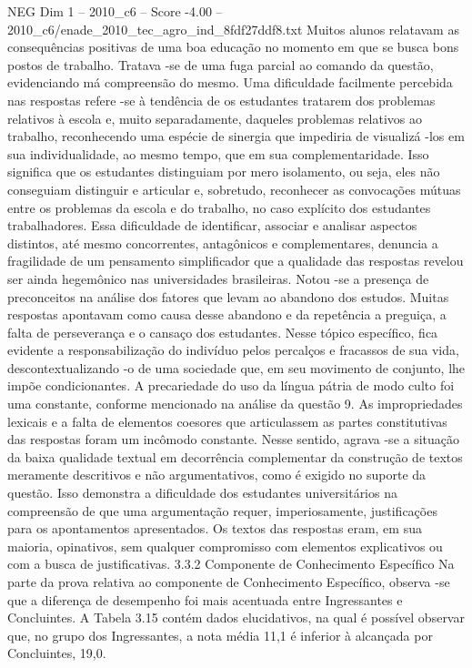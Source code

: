 \begin{textsample}{NEG Dim 1 – 2010\_c6 – Score -4.00 – 2010\_c6/enade\_2010\_tec\_agro\_ind\_8fdf27ddf8.txt}
Muitos alunos relatavam as consequências positivas de uma boa educação no momento em que se busca bons postos de trabalho.
Tratava -se de uma fuga parcial ao comando da questão, evidenciando má compreensão do mesmo.
Uma dificuldade facilmente percebida nas respostas refere -se à tendência de os estudantes tratarem dos problemas relativos à escola e, muito separadamente, daqueles problemas relativos ao trabalho, reconhecendo uma espécie de sinergia que impediria de visualizá -los em sua individualidade, ao mesmo tempo, que em sua complementaridade.
Isso significa que os estudantes distinguiam por mero isolamento, ou seja, eles não conseguiam distinguir e articular e, sobretudo, reconhecer as convocações mútuas entre os problemas da escola e do trabalho, no caso explícito dos estudantes trabalhadores.
Essa dificuldade de identificar, associar e analisar aspectos distintos, até mesmo concorrentes, antagônicos e complementares, denuncia a fragilidade de um pensamento simplificador que a qualidade das respostas revelou ser ainda hegemônico nas universidades brasileiras.
Notou -se a presença de preconceitos na análise dos fatores que levam ao abandono dos estudos.
Muitas respostas apontavam como causa desse abandono e da repetência a preguiça, a falta de perseverança e o cansaço dos estudantes.
Nesse tópico específico, fica evidente a responsabilização do indivíduo pelos percalços e fracassos de sua vida, descontextualizando -o de uma sociedade que, em seu movimento de conjunto, lhe impõe condicionantes.
A precariedade do uso da língua pátria de modo culto foi uma constante, conforme mencionado na análise da questão 9.
As impropriedades lexicais e a falta de elementos coesores que articulassem as partes constitutivas das respostas foram um incômodo constante.
Nesse sentido, agrava -se a situação da baixa qualidade textual em decorrência complementar da construção de textos meramente descritivos e não argumentativos, como é exigido no suporte da questão.
Isso demonstra a dificuldade dos estudantes universitários na compreensão de que uma argumentação requer, imperiosamente, justificações para os apontamentos apresentados.
Os textos das respostas eram, em sua maioria, opinativos, sem qualquer compromisso com elementos explicativos ou com a busca de justificativas. 3.3.2 Componente de Conhecimento Específico Na parte da prova relativa ao componente de Conhecimento Específico, observa -se que a diferença de desempenho foi mais acentuada entre Ingressantes e Concluintes.
A Tabela 3.15 contém dados elucidativos, na qual é possível observar que, no grupo dos Ingressantes, a nota média 11,1 é inferior à alcançada por Concluintes, 19,0.

\end{textsample}
